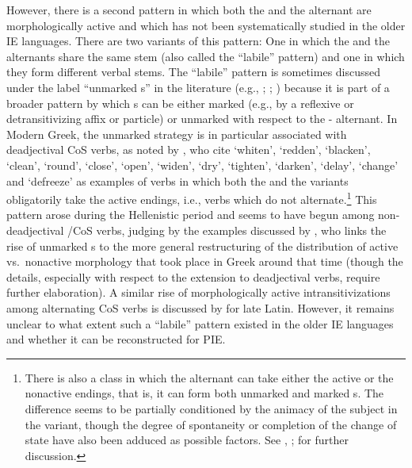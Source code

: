\documentclass[output=paper,colorlinks,citecolor=brown]{langscibook}
\begin{document}
However, there is a second pattern in which both the  and the  alternant are morphologically active and which has not been systematically studied in the older IE languages. There are two variants of this pattern: One in which the  and the  alternants share the same stem (also called the ``labile'' pattern) and one in which they form different verbal stems. The ``labile'' pattern is sometimes discussed under the label  ``unmarked s'' in the literature (e.g., \citealt{Schafer2008}; \citealt{Heidinger2010}; \citealt{Alexiadouetal2015}) because it is part of a broader pattern by which s can be either marked (e.g., by a reflexive or detransitivizing affix or particle) or unmarked with respect to the - alternant. In Modern Greek, the unmarked strategy is in particular associated with deadjectival  CoS  verbs, as noted by \citet[125]{Alexiadou2004}, who cite  `whiten',  `redden',  `blacken',  `clean',  `round',  `close',  `open',   `widen',  `dry',  `tighten',  `darken',  `delay',  `change' and   `defreeze' as examples of verbs in which both the  and the  variants obligatorily take the active endings, i.e., verbs which do not alternate.\footnote{There is also a class in which the  alternant can take either the active or the nonactive endings, that is, it can form both unmarked and marked s. The difference seems to be partially conditioned by the animacy of the subject in the  variant, though the degree of spontaneity or completion of the change of state  have also been adduced as possible factors. See \citealt{Alexiadou2004}, \citeyear{AlexiadouAnagnostopoulou2013}; \citealt[88--90]{Alexiadouetal2015} for further discussion.} This pattern arose during the Hellenistic period and seems to have begun among non-deadjectival /CoS  verbs, judging by the examples discussed by \citet[112--116]{Lavidas2009}, who links the rise of unmarked s to the more general restructuring of the distribution of active vs.\ nonactive morphology that took place in Greek around that time (though the details, especially with respect to the extension to deadjectival verbs, require further elaboration). A similar rise of morphologically active intransitivizations among alternating CoS  verbs is discussed by \citet{Gianollo2014} for late Latin. However, it remains unclear  to what extent  such a ``labile'' pattern existed in the older IE languages and whether it can be reconstructed for PIE. 
\end{document}
